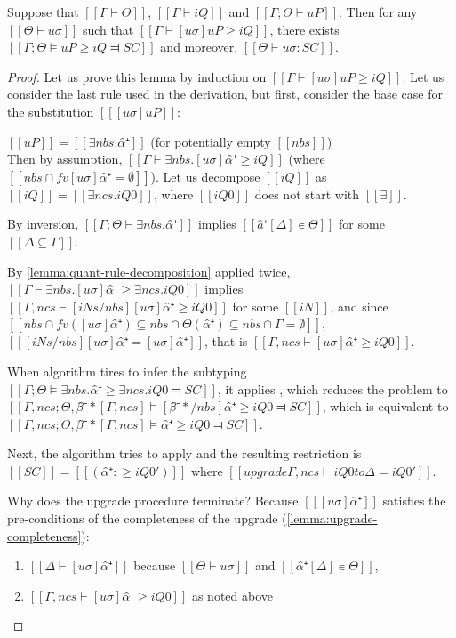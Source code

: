 \begin{lemma} \label{lemma:pos-subt-completeness}
    Suppose that $[[Γ ⊢ Θ]]$, $[[Γ ⊢ iQ]]$ and $[[Γ ; Θ ⊢ uP]]$.
    Then for any $[[Θ ⊢ uσ]]$ such that $[[ Γ ⊢ [uσ]uP ≥ iQ ]]$,
    there exists $[[Γ; Θ ⊨ uP ≥ iQ ⫤ SC]]$ and moreover, $[[Θ ⊢ uσ : SC]]$.
\end{lemma}
\begin{proof}
    Let us prove this lemma by induction on $[[ Γ ⊢ [uσ]uP ≥ iQ ]]$.
    Let us consider the last rule used in the derivation,
    but first, consider the base case for the substitution $[[ [uσ]uP ]]$:
    \begin{caseof}
        \item \label{case:pos-subt-complete-base} $[[uP]] = [[ ∃nbs.α̂⁺ ]]$ 
            (for potentially empty $[[nbs]]$)\\
            Then by assumption, $[[ Γ ⊢ ∃nbs.[uσ]α̂⁺ ≥ iQ ]]$ (where $[[ {nbs} ∩ fv [uσ]α̂⁺ = ∅]]$).
            Let us decompose $[[iQ]]$ as $[[iQ]] = [[∃ncs.iQ0]]$, where $[[iQ0]]$ does
            not start with $[[∃]]$. 

            By inversion, $[[Γ ; Θ ⊢ ∃nbs.α̂⁺]]$ implies $[[â⁺[Δ] ∊ Θ]]$ for some 
            $[[{Δ} ⊆ {Γ}]]$.

            By \cref{lemma:quant-rule-decomposition} applied twice, 
            $[[ Γ ⊢ ∃nbs.[uσ]α̂⁺ ≥ ∃ncs.iQ0 ]]$ implies
            $[[ Γ,ncs  ⊢ [iNs/nbs][uσ]α̂⁺ ≥ iQ0 ]]$ for some $[[iN]]$, 
            and since $[[ {nbs} ∩ fv([uσ]α̂⁺) ⊆ {nbs} ∩ {Θ(α̂⁺)} ⊆ {nbs} ∩ {Γ} = ∅ ]]$,
            $[[ [iNs/nbs][uσ]α̂⁺ = [uσ]α̂⁺ ]]$, that is $[[ Γ,ncs ⊢ [uσ]α̂⁺ ≥ iQ0]]$.

            When algorithm tires to infer the subtyping 
            $[[Γ; Θ ⊨ ∃nbs.α̂⁺ ≥ ∃ncs.iQ0 ⫤ SC]]$,
            it applies ,
            which reduces the problem to
            $[[Γ, ncs; Θ, β̂⁻*[Γ, ncs] ⊨ [β̂⁻*/nbs] α̂⁺ ≥ iQ0 ⫤ SC]]$, 
            which is equivalent to 
            $[[Γ, ncs; Θ, β̂⁻*[Γ, ncs] ⊨ α̂⁺ ≥ iQ0 ⫤ SC]]$.

            Next, the algorithm tries to apply
            and the resulting restriction is $[[SC]] = [[(α̂⁺ :≥ iQ0')]]$ where
            $[[upgrade Γ, ncs ⊢ iQ0 to Δ = iQ0']]$.

            Why does the upgrade procedure terminate?
            Because $[[ [uσ]α̂⁺ ]]$ satisfies the pre-conditions of the completeness of the upgrade
            (\cref{lemma:upgrade-completeness}):
            \begin{enumerate}
                \item $[[Δ ⊢ [uσ]α̂⁺ ]]$ because $[[Θ ⊢ uσ]]$ and $[[α̂⁺[Δ] ∊ Θ]]$,
                \item $[[ Γ,ncs ⊢ [uσ]α̂⁺ ≥ iQ0]]$ as noted above
            \end{enumerate}


\end{caseof}
\end{proof}
